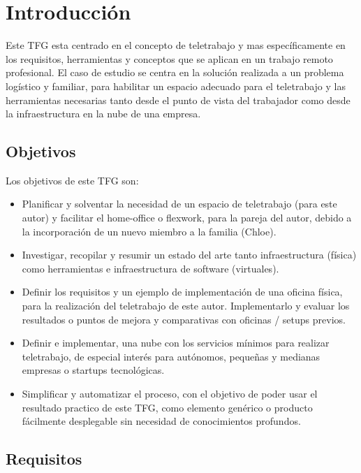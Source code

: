 \cleardoublepage
{}
\chapter*{Introducción}
Este TFG esta centrado en el concepto de teletrabajo y mas específicamente en los requisitos, herramientas y conceptos que se aplican en un trabajo remoto profesional. El caso de estudio se centra en la solución realizada a un problema logístico y familiar, para habilitar un espacio adecuado para el teletrabajo y las herramientas necesarias tanto desde el punto de vista del trabajador como desde la infraestructura en la nube de una empresa.

\section{Objetivos}
Los objetivos de este TFG son:
\begin{itemize}
    \item Planificar y solventar la necesidad de un espacio de teletrabajo (para este autor) y facilitar el home-office o flexwork, para la pareja del autor, debido a la incorporación de un nuevo miembro a la familia (Chloe).  
    
    \item Investigar, recopilar y resumir un estado del arte tanto infraestructura (física) como herramientas e infraestructura de software (virtuales).
    
    \item Definir los requisitos y un ejemplo de implementación de una oficina física, para la realización del teletrabajo de este autor. Implementarlo y evaluar los resultados o puntos de mejora y comparativas con oficinas / setups previos.
    
    \item Definir e implementar, una nube con los servicios mínimos para realizar teletrabajo, de especial interés para autónomos, pequeñas y medianas empresas o startups tecnológicas.
    
    \item Simplificar y automatizar el proceso, con el objetivo de poder usar el resultado practico de este TFG, como elemento genérico o producto fácilmente desplegable sin necesidad de conocimientos profundos.

\end{itemize}

\section{Requisitos}

